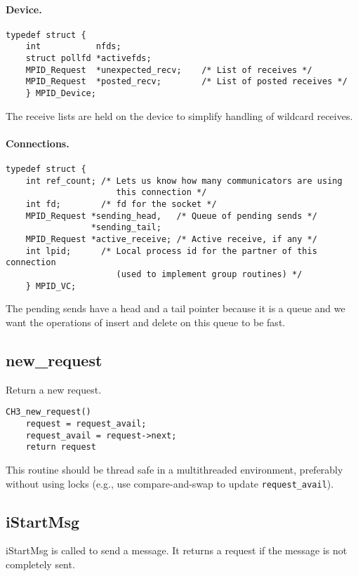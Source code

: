 \documentclass{article}
\def\code{\begingroup\makeustext\eatcode}
\def\eatcode#1{\texttt{#1}\endgroup}
\begin{document}
\paragraph{Device.}
\begin{verbatim}
typedef struct {
    int           nfds;
    struct pollfd *activefds;
    MPID_Request  *unexpected_recv;    /* List of receives */
    MPID_Request  *posted_recv;        /* List of posted receives */
    } MPID_Device;
\end{verbatim}
The receive lists are held on the device to simplify handling of wildcard
receives.  

\paragraph{Connections.}

\begin{verbatim}
typedef struct { 
    int ref_count; /* Lets us know how many communicators are using
                      this connection */
    int fd;        /* fd for the socket */
    MPID_Request *sending_head,   /* Queue of pending sends */
                 *sending_tail;
    MPID_Request *active_receive; /* Active receive, if any */
    int lpid;      /* Local process id for the partner of this connection
                      (used to implement group routines) */
    } MPID_VC;
\end{verbatim}
The pending sends have a head and a tail pointer because it is a queue and we
want the operations of insert and delete on this queue to be fast.

\subsection{new\_request}
Return a new request.  

\begin{verbatim}
CH3_new_request() 
    request = request_avail;
    request_avail = request->next;
    return request
\end{verbatim}
This routine should be thread safe in a multithreaded environment, preferably
without using locks (e.g., use compare-and-swap to update
\code{request_avail}).  

\subsection{iStartMsg}
iStartMsg is called to send a message.  It returns a request if the message is
not completely sent.
\end{document}
